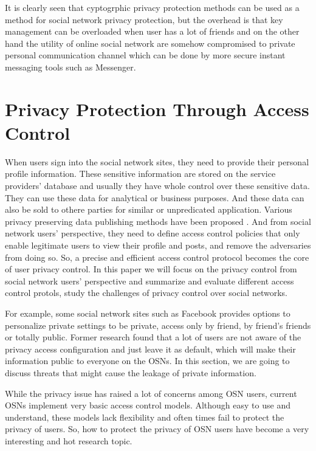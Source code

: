 \documentclass[12pt]{article}
\begin{document}
It is clearly seen that cyptogrphic privacy protection methods can be
used as a method for social network privacy protection, but the
overhead is that key management can be overloaded when user has a lot
of friends and on the other hand the utility of online social network
are somehow compromised to private personal communication channel
which can be done by more secure instant messaging tools such as
Messenger. 

\section{Privacy Protection Through Access Control \label{sec:accon}}
When users sign into the social network sites, they need to provide
their personal profile information. These sensitive information are
stored on the service providers' database and usually they have whole 
control over these sensitive data. They can use these data for
analytical or business purposes. And these data can also be sold to
othere parties for similar or unpredicated application. Various
privacy preserving data publishing methods have been proposed
\cite{ppdp-survey}. And from social network
users' perspective, they need to define access control policies that
only enable legitimate users to view their profile and posts, and
remove the adversaries from doing so. So, a precise and efficient access
control protocol becomes the core of user privacy control. In this
paper we will focus on the privacy control from social network users'
perspective and summarize and evaluate different access control
protols, study the challenges of privacy control over social
networks. 

For example, some social network sites such as Facebook provides
options to personalize private settings to be private, access only by
friend, by friend's friends or totally public. Former
research\cite{privacy-wizard} found that a lot of users are not aware
of the privacy access configuration and just leave it as default,
which will make their information public to everyone on the OSNs. In
this section, we are going to discuss threats that might cause the
leakage of private information.

While the privacy issue has raised a lot of concerns among OSN users,
current OSNs implement very basic access control models. Although easy
to use and understand, these models lack flexibility and often times
fail to protect the privacy of users. So, how to protect the privacy
of OSN users have become a very interesting and hot research topic.
\end{document}
